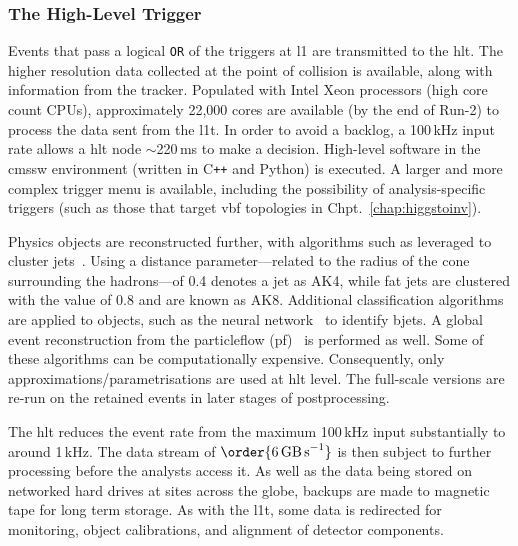 

\subsubsection{The High-Level Trigger}
\label{subsubsec:detector_hlt}

Events that pass a logical \texttt{OR} of the triggers at \acrlong{l1} are transmitted to the \acrshort{hlt}. The higher resolution data collected at the point of collision is available, along with information from the tracker. Populated with Intel Xeon processors (high core count CPUs), approximately 22,000 cores are available (by the end of Run-2) to process the data sent from the \acrshort{l1t}. In order to avoid a backlog, a 100\,kHz input rate allows a \acrshort{hlt} node $\sim$220\,ms to make a decision. High-level software in the \acrshort{cmssw} environment (written in C\texttt{++} and Python) is executed. A larger and more complex trigger menu is available, including the possibility of analysis-specific triggers (such as those that target \acrshort{vbf} topologies in Chpt.~\ref{chap:higgstoinv}).

Physics objects are reconstructed further, with algorithms such as  leveraged to cluster \glspl{jet}~\cite{Cacciari:2008gp}. Using a distance parameter---related to the radius of the cone surrounding the hadrons---of 0.4 denotes a \gls{jet} as AK4, while fat jets are clustered with the value of 0.8 and are known as AK8. Additional classification algorithms are applied to objects, such as the \deepcsv neural network~\cite{Sirunyan:2017ezt} to identify \glspl{bjet}. A global event reconstruction from the \gls{particleflow} (\acrshort{pf})~\cite{CMS-PAS-PFT-09-001,CMS-PRF-14-001} is performed as well. Some of these algorithms can be computationally expensive. Consequently, only approximations/parametrisations are used at \acrshort{hlt} level. The full-scale versions are re-run on the retained events in later stages of postprocessing.

The \acrshort{hlt} reduces the event rate from the maximum 100\,kHz input substantially to around 1\,kHz. The data stream of $\order{\text{6\,GB\,s}^{-1}}$ is then subject to further processing before the analysts access it. As well as the data being stored on networked hard drives at sites across the globe, backups are made to magnetic tape for long term storage. As with the \acrlong{l1t}, some data is redirected for monitoring, object calibrations, and alignment of detector components.


